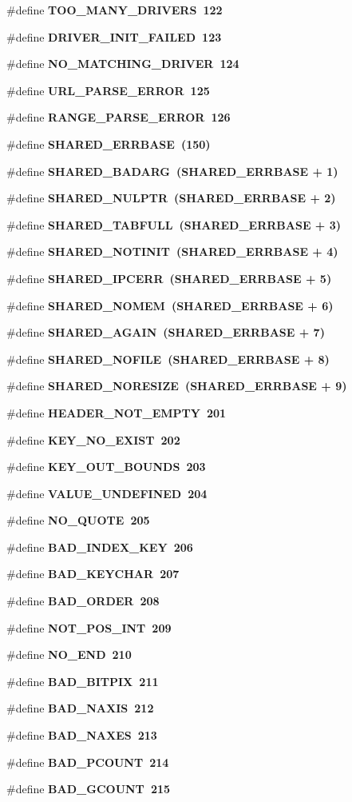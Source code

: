\begin{CompactItemize}
\#define \bf{TOO\_\-MANY\_\-DRIVERS}~122
\item 
\#define \bf{DRIVER\_\-INIT\_\-FAILED}~123
\item 
\#define \bf{NO\_\-MATCHING\_\-DRIVER}~124
\item 
\#define \bf{URL\_\-PARSE\_\-ERROR}~125
\item 
\#define \bf{RANGE\_\-PARSE\_\-ERROR}~126
\item 
\#define \bf{SHARED\_\-ERRBASE}~(150)
\item 
\#define \bf{SHARED\_\-BADARG}~(SHARED\_\-ERRBASE + 1)
\item 
\#define \bf{SHARED\_\-NULPTR}~(SHARED\_\-ERRBASE + 2)
\item 
\#define \bf{SHARED\_\-TABFULL}~(SHARED\_\-ERRBASE + 3)
\item 
\#define \bf{SHARED\_\-NOTINIT}~(SHARED\_\-ERRBASE + 4)
\item 
\#define \bf{SHARED\_\-IPCERR}~(SHARED\_\-ERRBASE + 5)
\item 
\#define \bf{SHARED\_\-NOMEM}~(SHARED\_\-ERRBASE + 6)
\item 
\#define \bf{SHARED\_\-AGAIN}~(SHARED\_\-ERRBASE + 7)
\item 
\#define \bf{SHARED\_\-NOFILE}~(SHARED\_\-ERRBASE + 8)
\item 
\#define \bf{SHARED\_\-NORESIZE}~(SHARED\_\-ERRBASE + 9)
\item 
\#define \bf{HEADER\_\-NOT\_\-EMPTY}~201
\item 
\#define \bf{KEY\_\-NO\_\-EXIST}~202
\item 
\#define \bf{KEY\_\-OUT\_\-BOUNDS}~203
\item 
\#define \bf{VALUE\_\-UNDEFINED}~204
\item 
\#define \bf{NO\_\-QUOTE}~205
\item 
\#define \bf{BAD\_\-INDEX\_\-KEY}~206
\item 
\#define \bf{BAD\_\-KEYCHAR}~207
\item 
\#define \bf{BAD\_\-ORDER}~208
\item 
\#define \bf{NOT\_\-POS\_\-INT}~209
\item 
\#define \bf{NO\_\-END}~210
\item 
\#define \bf{BAD\_\-BITPIX}~211
\item 
\#define \bf{BAD\_\-NAXIS}~212
\item 
\#define \bf{BAD\_\-NAXES}~213
\item 
\#define \bf{BAD\_\-PCOUNT}~214
\item 
\#define \bf{BAD\_\-GCOUNT}~215

\end{CompactItemize}
